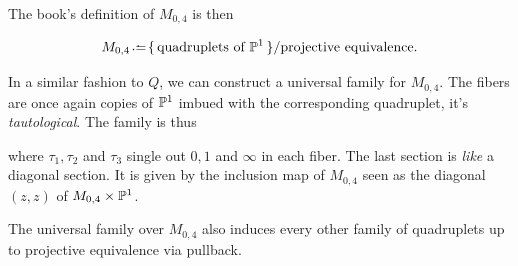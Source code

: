 \documentclass[12pt]{memoir}
\begin{document}
The book's definition of \(M_{0,4}\) is then

\[M_{0,4}\defeq\set{\text{quadruplets of }\bP^1}/\text{projective equivalence}.\]

In a similar fashion to \(Q\), we can construct a universal family for \(M_{0,4}\). The fibers are once again copies of \(\mathbb{P}^1\) imbued with the corresponding quadruplet, it's \emph{tautological}. The family is thus
\begin{center}
\end{center}
where \(\tau_1,\tau_2\) and \(\tau_3\) single out \(0,1\) and \(\infty\) in each fiber. The last section is \emph{like} a diagonal section. It is given by the inclusion map of \(M_{0,4}\) seen as the diagonal \((z,z)\) of \(M_{0,4}\times\mathbb{P}^1\).

\begin{Th}
    The universal family over \(M_{0,4}\) also induces every other family of quadruplets up to projective equivalence via pullback.
\end{Th}
\end{document}
